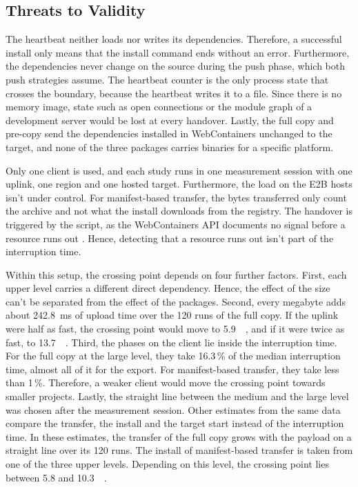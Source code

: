\subsection{Threats to Validity}

The heartbeat neither loads nor writes its dependencies. Therefore, a successful install only means that the install command ends without an error. Furthermore, the dependencies never change on the source during the push phase, which both push strategies assume. The heartbeat counter is the only process state that crosses the boundary, because the heartbeat writes it to a file. Since there is no memory image, state such as open connections or the module graph of a development server would be lost at every handover. Lastly, the full copy and pre-copy send the dependencies installed in WebContainers unchanged to the target, and none of the three packages carries binaries for a specific platform.

Only one client is used, and each study runs in one measurement session with one uplink, one region and one hosted target. Furthermore, the load on the E2B hosts isn't under control. For manifest-based transfer, the bytes transferred only count the archive and not what the install downloads from the registry. The handover is triggered by the script, as the WebContainers \ac{API} documents no signal before a resource runs out \cite{stackblitz-2024}. Hence, detecting that a resource runs out isn't part of the interruption time.

Within this setup, the crossing point depends on four further factors. First, each upper level carries a different direct dependency. Hence, the effect of the size can't be separated from the effect of the packages. Second, every megabyte adds about \SI{242.8}{\milli\second} of upload time over the 120 runs of the full copy. If the uplink were half as fast, the crossing point would move to \SI{5.9}{\mega\byte}, and if it were twice as fast, to \SI{13.7}{\mega\byte}. Third, the phases on the client lie inside the interruption time. For the full copy at the large level, they take 16.3\,\% of the median interruption time, almost all of it for the export. For manifest-based transfer, they take less than 1\,\%. Therefore, a weaker client would move the crossing point towards smaller projects. Lastly, the straight line between the medium and the large level was chosen after the measurement session. Other estimates from the same data compare the transfer, the install and the target start instead of the interruption time. In these estimates, the transfer of the full copy grows with the payload on a straight line over its 120 runs. The install of manifest-based transfer is taken from one of the three upper levels. Depending on this level, the crossing point lies between 5.8 and \SI{10.3}{\mega\byte}.

